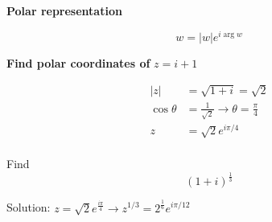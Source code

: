 \documentclass[../notes.tex]{subfiles}
\begin{document}
	\begin{remark}
		\textbf{Polar representation} 

		\begin{equation}
			w = |w| e^{i \arg w}
		\end{equation}


		\begin{example}
			\textbf{Find polar coordinates of}  $ z = i+1 $ 

			\begin{equation}
				\begin{split}
					|z| &= \sqrt{1+i} = \sqrt{2}    \\
					\cos \theta &= \frac{1}{\sqrt{2} } \rightarrow \theta = \frac{\pi}{4} \\
					z &= \sqrt{2} e^{i\pi/4}  \\
				\end{split}
			\end{equation}
			


		\end{example}
		

		\begin{example}
			Find \begin{equation}
				(1+i)^{\frac{1}{3}}
			\end{equation}

			Solution:
			$ z = \sqrt{2} e^{\frac{i\pi}{4}} \rightarrow z^{1/3} = 2^{\frac{1}{6}} e^{i\pi/12} $ 
			
		\end{example}
		
	\end{remark}
\end{document}
